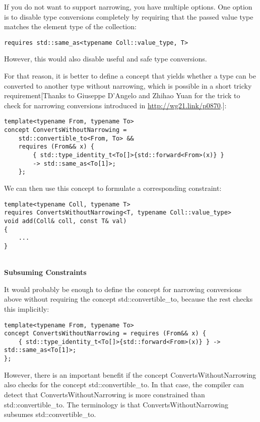 If you do not want to support narrowing, you have multiple options. One option is to disable type conversions completely by requiring that the passed value type matches the element type of the collection:

\begin{lstlisting}[style=styleCXX]
requires std::same_as<typename Coll::value_type, T>
\end{lstlisting}

However, this would also disable useful and safe type conversions.

For that reason, it is better to define a concept that yields whether a type can be converted to another type without narrowing, which is possible in a short tricky requirement[Thanks to Giuseppe D’Angelo and Zhihao Yuan for the trick to check for narrowing conversions introduced in \url{http://wg21.link/p0870}.]:

\begin{lstlisting}[style=styleCXX]
template<typename From, typename To>
concept ConvertsWithoutNarrowing =
	std::convertible_to<From, To> &&
	requires (From&& x) {
		{ std::type_identity_t<To[]>{std::forward<From>(x)} }
		-> std::same_as<To[1]>;
	};
\end{lstlisting}

We can then use this concept to formulate a corresponding constraint:

\begin{lstlisting}[style=styleCXX]
template<typename Coll, typename T>
requires ConvertsWithoutNarrowing<T, typename Coll::value_type>
void add(Coll& coll, const T& val)
{
	...
}
\end{lstlisting}

\noindent
\hspace*{\fill} \\ %
\textbf{Subsuming Constraints}

It would probably be enough to define the concept for narrowing conversions above without requiring the concept std::convertible\_to, because the rest checks this implicitly:

\begin{lstlisting}[style=styleCXX]
template<typename From, typename To>
concept ConvertsWithoutNarrowing = requires (From&& x) {
	{ std::type_identity_t<To[]>{std::forward<From>(x)} } -> std::same_as<To[1]>;
};
\end{lstlisting}

However, there is an important benefit if the concept ConvertsWithoutNarrowing also checks for the concept std::convertible\_to. In that case, the compiler can detect that ConvertsWithoutNarrowing is more constrained than std::convertible\_to. The terminology is that ConvertsWithoutNarrowing subsumes std::convertible\_to.

